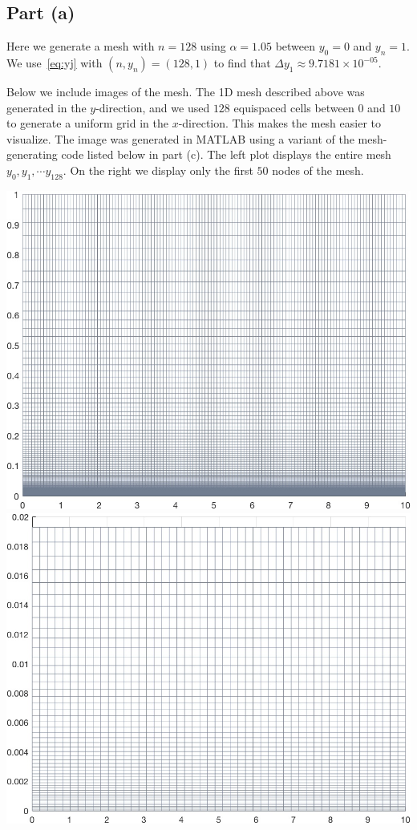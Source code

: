 \documentclass{article}
\begin{document}
\subsection{Part (a)}
Here we generate a mesh with $n=128$ using $ \alpha = 1.05$ between $y_0 = 0$ and $y_n = 1$.  We use~\eqref{eq:yj} with $(n, y_n) = (128, 1)$ to find that $ \Delta y_1 \approx 9.7181 \times 10^{-05} $.  

Below we include images of the mesh. The 1D mesh described above was generated in the $y$-direction, and we used $128$ equispaced cells between $0$ and $10$ to generate a uniform grid in the $x$-direction. This makes the mesh easier to visualize. The image was generated in MATLAB using a variant of the mesh-generating code listed below in part (c).
The left plot displays the entire mesh $y_0, y_1, \cdots y_{128}$. On the right we display only the first $50$ nodes of the mesh. 

\vspace{1cm}

\includegraphics[width=.45\textwidth]{meshgrid.jpg} 
\includegraphics[width=.45\textwidth]{meshgrid_small.jpg} 
\end{document}
